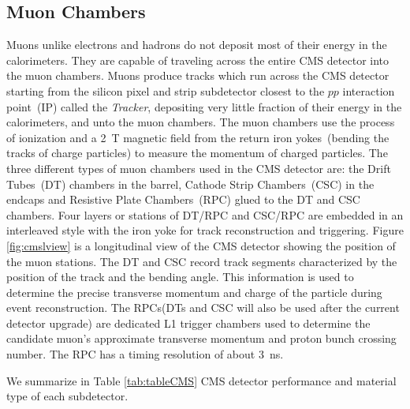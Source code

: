 \subsection{Muon Chambers}
Muons unlike electrons and hadrons do not deposit most of their energy in the calorimeters.
They are capable of traveling across the entire CMS detector into the muon chambers. Muons produce tracks which run across the CMS detector starting from the silicon pixel and strip subdetector closest to the $pp$ interaction point~(IP) called the \textit{Tracker}, depositing very little fraction of their energy in the calorimeters, and unto the muon chambers. 
The muon chambers use the process of ionization and a 2~T magnetic field from the return iron yokes~(bending the tracks of charge particles) to measure the momentum of charged particles.
The three different types of muon chambers used in the CMS detector are: the Drift Tubes~(DT) chambers in the barrel, Cathode Strip Chambers~(CSC) in the endcaps and Resistive Plate Chambers~(RPC) glued to the DT and CSC chambers.
Four layers or stations of DT/RPC and CSC/RPC are embedded in an interleaved  style with the iron yoke for track reconstruction and triggering. Figure \ref{fig:cmslview} is a longitudinal view of the CMS detector showing the position of the muon stations.
The DT and CSC record track segments characterized by the position of the track and the bending angle. This information is used to determine the precise transverse momentum and charge of the particle during event reconstruction.
The RPCs(DTs and CSC will also be used after the current detector upgrade) are dedicated L1 trigger chambers used to determine the candidate muon's approximate transverse momentum and proton bunch crossing number. The RPC has a timing resolution of about 3~ns.
 \par 
We summarize in Table \ref{tab:tableCMS} CMS detector performance and material type of each subdetector.


